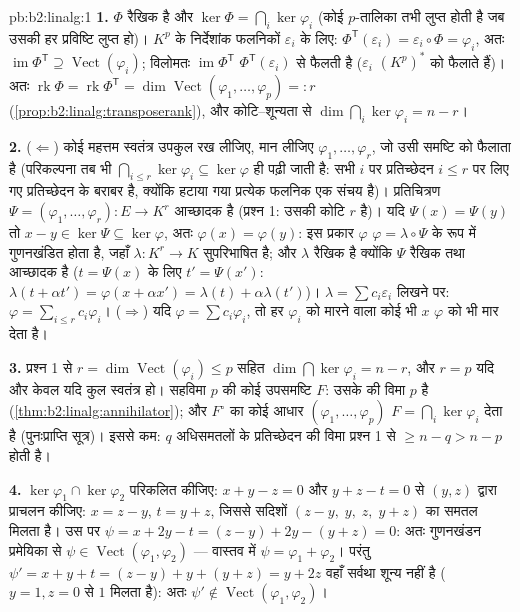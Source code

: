 \begin{solution}{pb:b2:linalg:1}
\textbf{1.} $\Phi$ रैखिक है और $\ker\Phi = \bigcap_i
\ker\varphi_i$ (कोई $p$-तालिका तभी लुप्त होती है जब
उसकी हर प्रविष्टि लुप्त हो)। $K^p$ के निर्देशांक फलनिकों $\varepsilon_i$ के लिए:
$\Phi^{\mathsf
T}(\varepsilon_i) = \varepsilon_i \circ \Phi = \varphi_i$, अतः $\operatorname{im}\Phi^{\mathsf T} \supseteq
\operatorname{Vect}(\varphi_i)$; विलोमतः $\operatorname{im}\Phi^{\mathsf T}$ $\Phi^{\mathsf T}(\varepsilon_i)$ से फैलती है ($\varepsilon_i$ $(K^p)^*$ को फैलाते हैं)।
अतः $\operatorname{rk}\Phi = \operatorname{rk}
\Phi^{\mathsf T} = \dim\operatorname{Vect}(\varphi_1, \dots,
\varphi_p) =: r$ (\cref{prop:b2:linalg:transposerank}), और कोटि--शून्यता से $\dim\bigcap_i\ker\varphi_i = n - r$।

\textbf{2.} ($\Leftarrow$) कोई महत्तम स्वतंत्र उपकुल रख लीजिए, मान लीजिए $\varphi_1, \dots, \varphi_r$,
जो उसी समष्टि को फैलाता है (परिकल्पना तब भी $\bigcap_{i \leq r}\ker\varphi_i \subseteq
\ker\varphi$ ही पढ़ी जाती है: सभी
$i$ पर प्रतिच्छेदन $i \leq r$ पर लिए गए प्रतिच्छेदन के बराबर है, क्योंकि हटाया
गया प्रत्येक फलनिक एक संचय है)। प्रतिचित्रण $\Psi = (\varphi_1, \dots, \varphi_r) \colon E \to K^r$ आच्छादक है (प्रश्न 1:
उसकी कोटि $r$ है)। यदि $\Psi(x) = \Psi(y)$ तो $x - y \in \ker\Psi \subseteq \ker\varphi$, अतः $\varphi(x) =
\varphi(y)$: इस प्रकार $\varphi$ $\varphi = \lambda \circ \Psi$ के
रूप में गुणनखंडित होता है, जहाँ $\lambda \colon K^r \to K$ सुपरिभाषित है; और $\lambda$ रैखिक है
क्योंकि $\Psi$ रैखिक तथा आच्छादक है ($t = \Psi(x)$ के लिए $t' =
\Psi(x')$: $\lambda(t + \alpha t') = \varphi(x + \alpha x') =
\lambda(t) + \alpha\lambda(t')$)। $\lambda = \sum c_i
\varepsilon_i$
लिखने पर: $\varphi = \sum_{i \leq r} c_i\varphi_i$। ($\Rightarrow$) यदि $\varphi = \sum c_i \varphi_i$, तो हर $\varphi_i$ को मारने वाला कोई भी $x$
$\varphi$ को भी मार देता है।

\textbf{3.} प्रश्न 1 से $r = \dim\operatorname{Vect}(\varphi_i) \leq p$ सहित $\dim\bigcap\ker\varphi_i = n - r$, और $r = p$ यदि और केवल यदि कुल
स्वतंत्र हो। सहविमा $p$ की कोई उपसमष्टि $F$: उसके  की विमा $p$
है (\cref{thm:b2:linalg:annihilator}); और $F^\circ$ का कोई आधार $(\varphi_1, \dots,
\varphi_p)$ $F = \bigcap_i\ker\varphi_i$ देता है (पुनःप्राप्ति सूत्र)।
इससे कम: $q$ अधिसमतलों के प्रतिच्छेदन की विमा प्रश्न 1 से $\geq n - q > n - p$ होती
है।

\textbf{4.} $\ker\varphi_1 \cap \ker\varphi_2$ परिकलित कीजिए: $x
+ y - z = 0$ और $y + z - t = 0$ से $(y, z)$ द्वारा प्राचलन
कीजिए: $x = z
- y$, $t = y + z$, जिससे सदिशों $(z - y,\; y,\;
z,\; y + z)$ का समतल मिलता है। उस पर $\psi = x + 2y - t = (z - y) + 2y - (y + z)
= 0$: अतः
गुणनखंडन प्रमेयिका से $\psi \in
\operatorname{Vect}(\varphi_1, \varphi_2)$ --- वास्तव में $\psi =
\varphi_1 + \varphi_2$। परंतु $\psi' = x + y + t = (z - y) + y +
(y + z) = y + 2z$ वहाँ सर्वथा
शून्य नहीं है ($y = 1, z = 0$ से $1$ मिलता है): अतः $\psi' \notin \operatorname{Vect}(\varphi_1,
\varphi_2)$।


\end{solution}
